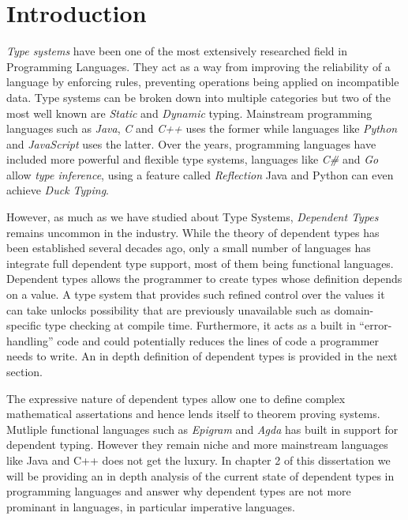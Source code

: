 \documentclass[a4paper,12pt]{report}
\begin{document}
\pagestyle{empty}
\singlespacing

\onehalfspacing

\singlespacing


\setcounter{page}{0}
\pagestyle{plain}
\tableofcontents
\listoffigures
\listoftables

\onehalfspacing


\chapter{Introduction}
\setcounter{page}{1} 
\textit{Type systems} have been one of the most extensively researched field in 
Programming Languages. They act as a way from improving the reliability of a 
language by enforcing rules, preventing operations being applied on 
incompatible data. Type systems can be broken down into multiple categories but 
two of the most well known are \textit{Static} and \textit{Dynamic} typing. Mainstream programming 
languages such as \textit{Java}, \textit{C} and \textit{C++} uses the former 
while languages like \textit{Python} and \textit{JavaScript} uses the latter. 
Over the years, programming languages have included more powerful and flexible 
type systems, languages like \textit{C\#} and \textit{Go} allow 
\textit{type inference}, using a feature called \textit{Reflection} 
Java and Python can even achieve \textit{Duck Typing}.

\par
However, as much as we have studied about Type Systems, \textit{Dependent Types} 
remains uncommon in the industry. While the theory of dependent types has been 
established several decades ago, only a small number of languages has 
integrate full dependent type support, most of them being functional languages. 
Dependent types allows the programmer to create types whose definition depends 
on a value. A type system that provides such refined control over the values it 
can take unlocks possibility that are previously unavailable such as 
domain-specific type checking at compile time. Furthermore, it acts as a built 
in ``error-handling'' code and could potentially 
reduces the lines of code a programmer needs to write. An in depth 
definition of dependent types is provided in the next section.

\par
The expressive nature of dependent types allow one to define complex 
mathematical assertations and hence lends itself to theorem proving systems. 
Mutliple functional languages such as \textit{Epigram} and \textit{Agda} has 
built in support for dependent typing. However they remain niche and more 
mainstream languages like Java and C++ does not get the luxury. In chapter 2 of 
this dissertation we will be providing an in depth analysis of the current state 
of dependent types in programming languages and answer why dependent types are 
not more prominant in languages, in particular imperative languages.
\end{document}
